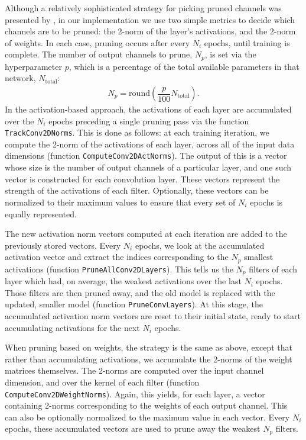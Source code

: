 \documentclass{article}
\begin{document}
Although a relatively sophisticated strategy for picking pruned channels was presented by \cite{prune_transfer_learning}, in our implementation we use two simple metrics to decide which channels are to be pruned: the 2-norm of the layer's activations, and the 2-norm of weights. In each case, pruning occurs after every $N_i$ epochs, until training is complete. The number of output channels to prune, $N_p$, is set via the hyperparameter $p$, which is a percentage of the total available parameters in that network, $N_\mathrm{total}$:
\begin{align}
	N_p = \mathrm{round} \left(\dfrac{p}{100}N_\mathrm{total}\right). \label{eqNp}
\end{align}
In the activation-based approach, the activations of each layer are accumulated over the $N_i$ epochs preceding a single pruning pass via the function \texttt{TrackConv2DNorms}. This is done as follows: at each training iteration, we compute the 2-norm of the activations of each layer, across all of the input data dimensions (function \texttt{ComputeConv2DActNorms}). The output of this is a vector whose size is the number of output channels of a particular layer, and one such vector is constructed for each convolution layer. These vectors represent the strength of the activations of each filter. Optionally, these vectors can be normalized to their maximum values to ensure that every set of $N_i$ epochs is equally represented.

The new activation norm vectors computed at each iteration are added to the previously stored vectors. Every $N_i$ epochs, we look at the accumulated activation vector and extract the indices corresponding to the $N_p$ smallest activations (function \texttt{PruneAllConv2DLayers}). This tells us the $N_p$ filters of each layer which had, on average, the weakest activations over the last $N_i$ epochs. Those filters are then pruned away, and the old model is replaced with the updated, smaller model (function \texttt{PruneConvLayers}). At this stage, the accumulated activation norm vectors are reset to their initial state, ready to start accumulating activations for the next $N_i$ epochs.

When pruning based on weights, the strategy is the same as above, except that rather than accumulating activations, we accumulate the 2-norms of the weight matrices themselves. The 2-norms are computed over the input channel dimension, and over the kernel of each filter (function \texttt{ComputeConv2DWeightNorms}). Again, this yields, for each layer, a vector containing 2-norms corresponding to the weights of each output channel. This can also be optionally normalized to the maximum value in each vector. Every $N_i$ epochs, these accumulated vectors are used to prune away the weakest $N_p$ filters.
\end{document}

